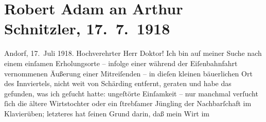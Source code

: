 

         
         \renewcommand{\erwaehntePersonen}{Personen: Robert Adam,  Charles I von England,  Hintermayer,  Hintermayer}
         \renewcommand{\erwaehnteOrte}{Orte: Andorf, Bayern, Innviertel, Schärding, Wien}
         \renewcommand{\erwaehnteWerke}{Werke: David Copperfield, Robert, Siebenkäs}
               \section[Robert Adam an Arthur Schnitzler, 17. 7. 1918]{ Robert Adam an Arthur Schnitzler, 17. 7. 1918}\nopagebreak{}\rehead{ }\begin{ledgroupsized}[t]{13cm}\normalsize\beginnumbering{} \toendnotes[C]{\smallbreak\pagebreak[2]} 
\toendnotes[C]{\smallbreak}\pstart
           \raggedleft{}{\pb}Andorf, 17. Juli
                  1918.\pend
           \pstart{}Hochverehrter Herr Doktor!\pend\pstart
           Ich bin auf meiner Suche nach einem einſamen Erholungsorte – infolge einer während
               der Eiſenbahnfahrt vernommenen Äußerung einer Mitreiſenden – in dieſen kleinen
               bäuerlichen Ort des Innviertels, nicht weit von
                  Schärding entfernt, geraten und habe das
               gefunden, was ich geſucht hatte: ungeſtörte Einſamkeit – nur manchmal verſucht ſich
               die ältere Wirtstochter oder
               ein ſtrebſamer Jüngling der Nachbarſchaft im Klavierüben; letzteres hat ſeinen Grund
               darin, daß mein Wirt im

\end{ledgroupsized}
